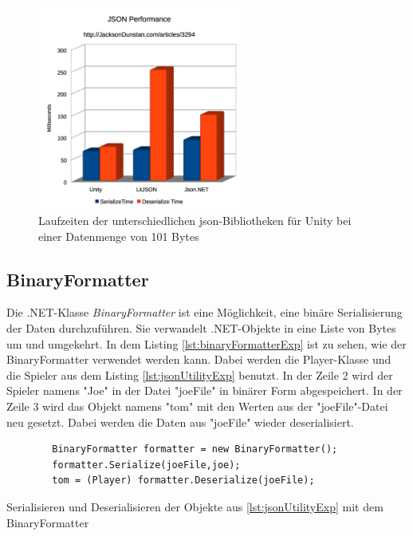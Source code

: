 \begin{figure}[htp]
    \centering
    \includegraphics[width=0.6\textwidth]{images/UnityJsonPerformance.png}
    \caption{Laufzeiten der unterschiedlichen \ac{json}-Bibliotheken für Unity bei einer Datenmenge von 101 Bytes \cite{jacksondunstanJacksonDunstancomJSON}}
    \label{fig:unityJsonPerformance}
\end{figure}



\subsection{BinaryFormatter}\label{ssec:binaryFormatter}
Die .NET-Klasse \textit{BinaryFormatter} ist eine Möglichkeit, eine binäre Serialisierung der Daten durchzuführen. Sie verwandelt .NET-Objekte in eine Liste von Bytes um und umgekehrt. In dem Listing \ref{lst:binaryFormatterExp} ist zu sehen, wie der BinaryFormatter verwendet werden kann. Dabei werden die Player-Klasse und die Spieler aus dem Listing \ref{lst:jsonUtilityExp} benutzt. In der Zeile 2 wird der Spieler namens "Joe" in der Datei "joeFile" in binärer Form abgespeichert. In der Zeile 3 wird das Objekt namens "tom" mit den Werten aus der "joeFile"-Datei neu gesetzt. Dabei werden die Daten aus "joeFile" wieder deserialisiert.\cite{microsoftBinaryFormatterClass} 

\begin{listing}[htp]
    \begin{verbatim} 
        BinaryFormatter formatter = new BinaryFormatter();
        formatter.Serialize(joeFile,joe);
        tom = (Player) formatter.Deserialize(joeFile);
    \end{verbatim}
    \caption{Serialisieren und Deserialisieren der Objekte aus \ref{lst:jsonUtilityExp} mit dem BinaryFormatter}
    \label{lst:binaryFormatterExp}
\end{listing}

